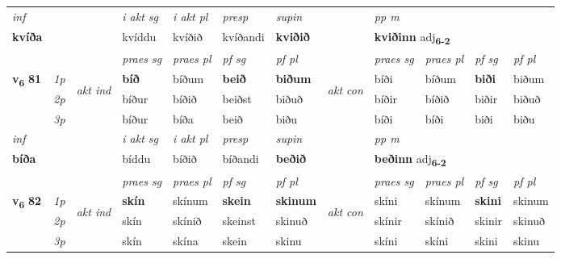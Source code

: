 \begin{longtable}[l]{X>{\footnotesize\itshape}llXXXXlXXXX}
   {\textit{inf}} & &  & \textit{i akt sg} & \textit{i akt pl}   & \textit{presp} & \textit{supin}  && \textit{pp m} \\*
  {\textbf{kvíða}} & && kvíddu  & kvíðið   & kvíðandi &  \textbf{kviðið}  && \multicolumn{2}{l}{\textbf{kviðinn} adj\textbf{\textsubscript{6-2}}} \\*

\midrule

 & &   & \textit{praes sg}  & \textit{praes pl}    & \textit{ pf sg} & \textit{pf pl} & & \textit{praes sg}  & \textit{praes pl}    & \textit{pf sg} & \textit{pf pl }  \\ \cmidrule{4-7} \cmidrule{9-12}
 \multirow{2}{*}{{{\textbf{v{\textsubscript{6}}} \Large{\textbf{81}}}}}  & 1p & \multirow{3}{*}{\begin{turn}{90}\textit{akt ind}\end{turn}} & \textbf{bíð} & bíðum & \textbf{beið} & \textbf{biðum} & \multirow{3}{*}{\begin{turn}{90}\textit{akt con}\end{turn}} &bíði & bíðum & \textbf{biði} & biðum\\*
 & 2p &  &  bíður  & bíðið & beiðst & biðuð & & bíðir & bíðið & biðir & biðuð \\*
 & 3p &  & bíður & bíða & beið & biðu & & bíði & bíði& biði & biðu \\*
\cmidrule{4-7} \cmidrule{9-12}

   {\textit{inf}} & &  & \textit{i akt sg} & \textit{i akt pl}   & \textit{presp} & \textit{supin}  && \textit{pp m} \\*
  {\textbf{bíða}} & && bíddu  & bíðið   & bíðandi &  \textbf{beðið}  && \multicolumn{2}{l}{\textbf{beðinn} adj\textbf{\textsubscript{6-2}}} \\*

\midrule

 & &   & \textit{praes sg}  & \textit{praes pl}    & \textit{ pf sg} & \textit{pf pl} & & \textit{praes sg}  & \textit{praes pl}    & \textit{pf sg} & \textit{pf pl }  \\ \cmidrule{4-7} \cmidrule{9-12}
 \multirow{2}{*}{{{\textbf{v{\textsubscript{6}}} \Large{\textbf{82}}}}}  & 1p & \multirow{3}{*}{\begin{turn}{90}\textit{akt ind}\end{turn}} & \textbf{skín} & skínum & \textbf{skein} & \textbf{skinum} & \multirow{3}{*}{\begin{turn}{90}\textit{akt con}\end{turn}} &skíni & skínum & \textbf{skini} & skinum\\*
 & 2p &  &  skín  & skínið & skeinst & skinuð & & skínir & skínið & skinir & skinuð \\*
 & 3p &  & skín & skína & skein & skinu & & skíni & skíni& skini & skinu \\*
\cmidrule{4-7} \cmidrule{9-12}


\end{longtable}
